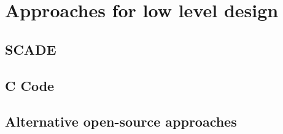
\section{Approaches for low level design}

\begin{comment}
to  complete later: SCADE ? OS approaches ?
\end{comment}

\subsection{SCADE}

\subsection{C Code}

\subsection{Alternative open-source approaches}


\begin{comment}
to  complete later depending the choices
\end{comment}